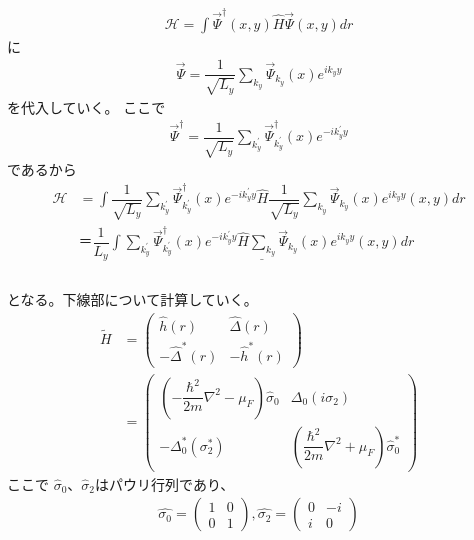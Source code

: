\documentclass{jarticle}
\begin{document}
	    \begin{align}
	   \mathcal{H}=\int\vec{\Psi}^\dagger(x,y)\hat{H}\vec{\Psi}(x,y)dr
	   \end{align}
	   に
	  \begin{align}
	   \vec{\Psi}=\dfrac{1}{\sqrt{L_y}}\displaystyle\sum_{k_y}\vec{\Psi}_{k_y}(x)e^{ik_yy}
	  \end{align}
	  を代入していく。
	  ここで
	  \begin{align}
	  \vec{\Psi}^\dagger=\dfrac{1}{\sqrt{L_y}}\displaystyle\sum_{k_y^{'}}\vec{\Psi}^\dagger_{k_y^{'}}(x)e^{-ik_y^{'}y}
	  \end{align}
	  であるから
	   \begin{align}
	  \mathcal{H}&=\int\dfrac{1}{\sqrt{L_y}}\displaystyle\sum_{k_y^{'}}\vec{\Psi}^\dagger_{k_y^{'}}(x)e^{-ik_y^{'}y}\hat{H}\dfrac{1}{\sqrt{L_y}}\displaystyle\sum_{k_y}\vec{\Psi}_{k_y}(x)e^{ik_yy}(x,y)dr\\&＝\dfrac{1}{L_y}\underline{\int\displaystyle\sum_{k_y^{'}}\vec{\Psi}^\dagger_{k_y^{'}}(x)e^{-ik_y^{'}y}\hat{H}\displaystyle\sum_{k_y}\vec{\Psi}_{k_y}(x)e^{ik_yy}(x,y)dr}\\
	  \label{star}
	  \end{align}
	   \\となる。下線部について計算していく。
  \begin{align}
  \tilde{H}&=
  \begin{pmatrix}
  \hat{h}(r) & \hat{\Delta}(r) \\
  -\hat{\Delta}^{*}(r) & -\hat{h}^{*}(r)
  \end{pmatrix}
   \\&=
     \begin{pmatrix}
   (-\dfrac{\hbar^2}{2m}\nabla^2-\mu_F)\hat{\sigma}_0 & \Delta_0(i\sigma_2) \\
   -\Delta^{*}_0(\sigma^{*}_2) & (\dfrac{\hbar^2}{2m}\nabla^2+\mu_F)\hat{\sigma}^{*}_0
   \end{pmatrix}
  \end{align}
  ここで
  $\hat\sigma_0$、$\hat\sigma_2$はパウリ行列であり、
  \begin{align}
  \hat{\sigma_0}=
  \begin{pmatrix}
  1 & 0 \\
  0 & 1
  \end{pmatrix},
  \hat{\sigma_2}=
  \begin{pmatrix}
  0 & -i \\
  i & 0
  \end{pmatrix}
  \end{align}
\end{document}
